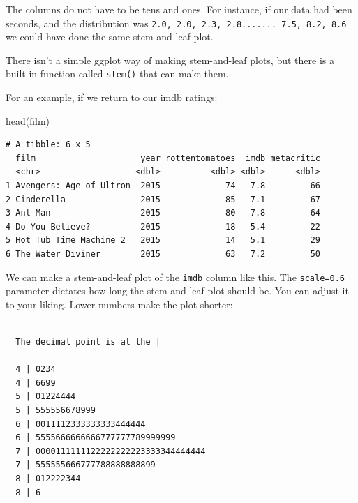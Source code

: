 \documentclass[
  letterpaper,
  DIV=11,
  numbers=noendperiod]{scrreprt}
\newenvironment{Shaded}{\begin{snugshade}}{\end{snugshade}}
\newcommand{\AttributeTok}[1]{\textcolor[rgb]{0.40,0.45,0.13}{#1}}
\newcommand{\FloatTok}[1]{\textcolor[rgb]{0.68,0.00,0.00}{#1}}
\newcommand{\FunctionTok}[1]{\textcolor[rgb]{0.28,0.35,0.67}{#1}}
\newcommand{\NormalTok}[1]{\textcolor[rgb]{0.00,0.23,0.31}{#1}}
\newcommand{\SpecialCharTok}[1]{\textcolor[rgb]{0.37,0.37,0.37}{#1}}
\begin{document}
The columns do not have to be tens and ones. For instance, if our data
had been seconds, and the distribution was
\texttt{2.0,\ 2.0,\ 2.3,\ 2.8.......\ 7.5,\ 8.2,\ 8.6} we could have
done the same stem-and-leaf plot.

There isn't a simple ggplot way of making stem-and-leaf plots, but there
is a built-in function called \texttt{stem()} that can make them.

For an example, if we return to our imdb ratings:

\begin{Shaded}
\begin{Highlighting}[]
\FunctionTok{head}\NormalTok{(film)}
\end{Highlighting}
\end{Shaded}

\begin{verbatim}
# A tibble: 6 x 5
  film                     year rottentomatoes  imdb metacritic
  <chr>                   <dbl>          <dbl> <dbl>      <dbl>
1 Avengers: Age of Ultron  2015             74   7.8         66
2 Cinderella               2015             85   7.1         67
3 Ant-Man                  2015             80   7.8         64
4 Do You Believe?          2015             18   5.4         22
5 Hot Tub Time Machine 2   2015             14   5.1         29
6 The Water Diviner        2015             63   7.2         50
\end{verbatim}

We can make a stem-and-leaf plot of the \texttt{imdb} column like this.
The \texttt{scale=0.6} parameter dictates how long the stem-and-leaf
plot should be. You can adjust it to your liking. Lower numbers make the
plot shorter:

\begin{Shaded}
\end{Shaded}

\begin{verbatim}

  The decimal point is at the |

  4 | 0234
  4 | 6699
  5 | 01224444
  5 | 555556678999
  6 | 0011112333333333444444
  6 | 5555666666666777777789999999
  7 | 0000111111122222222223333344444444
  7 | 555555666777788888888899
  8 | 012222344
  8 | 6
\end{verbatim}
\end{document}

